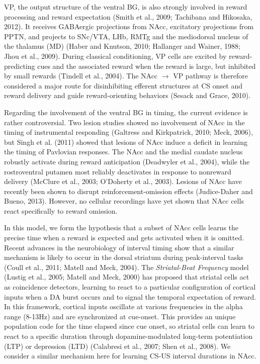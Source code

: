 \documentclass[
  11pt,
  a4paper,
]{scrbook}
\begin{document}
VP, the output structure of the ventral BG, is also strongly involved in
reward processing and reward expectation (Smith et al., 2009; Tachibana
and Hikosaka, 2012). It receives GABAergic projections from NAcc,
excitatory projections from PPTN, and projects to SNc/VTA, LHb, RMTg and
the mediodorsal nucleus of the thalamus (MD) (Haber and Knutson, 2010;
Hallanger and Wainer, 1988; Jhou et al., 2009). During classical
conditioning, VP cells are excited by reward-predicting cues and the
associated reward when the reward is large, but inhibited by small
rewards (Tindell et al., 2004). The NAcc \(\rightarrow\) VP pathway is
therefore considered a major route for disinhibiting efferent structures
at CS onset and reward delivery and guide reward-orienting behaviors
(Sesack and Grace, 2010).

Regarding the involvement of the ventral BG in timing, the current
evidence is rather controversial. Two lesion studies showed no
involvement of NAcc in the timing of instrumental responding (Galtress
and Kirkpatrick, 2010; Meck, 2006), but Singh et al. (2011) showed that
lesions of NAcc induce a deficit in learning the timing of Pavlovian
responses. The NAcc and the medial caudate nucleus robustly activate
during reward anticipation (Deadwyler et al., 2004), while the
rostroventral putamen most reliably deactivates in response to nonreward
delivery (McClure et al., 2003; O'Doherty et al., 2003). Lesions of NAcc
have recently been shown to disrupt reinforcement-omission effects
(Judice-Daher and Bueno, 2013). However, no cellular recordings have yet
shown that NAcc cells react specifically to reward omission.

In this model, we form the hypothesis that a subset of NAcc cells learns
the precise time when a reward is expected and gets activated when it is
omitted. Recent advances in the neurobiology of interval timing show
that a similar mechanism is likely to occur in the dorsal striatum
during peak-interval tasks (Coull et al., 2011; Matell and Meck, 2004).
The \emph{Striatal-Beat Frequency} model (Lustig et al., 2005; Matell
and Meck, 2000) has proposed that striatal cells act as coincidence
detectors, learning to react to a particular configuration of cortical
inputs when a DA burst occurs and to signal the temporal expectation of
reward. In this framework, cortical inputs oscillate at various
frequencies in the alpha range (8-13Hz) and are synchronized at
cue-onset. This provides an unique population code for the time elapsed
since cue onset, so striatal cells can learn to react to a specific
duration through dopamine-modulated long-term potentiation (LTP) or
depression (LTD) (Calabresi et al., 2007; Shen et al., 2008). We
consider a similar mechanism here for learning CS-US interval durations
in NAcc.
\end{document}
